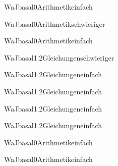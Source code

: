 \documentclass[12pt]{article}
\begin{document}
\begin{Add}{WaJ}{basal0}{Arithmetik}{einfach}
\end{Add}

\begin{Add}{WaJ}{basal0}{Arithmetik}{schwieriger}
\end{Add}

\begin{Add}{WaJ}{basal0}{Arithmetik}{einfach}
\end{Add}

\begin{Add}{WaJ}{basal1.2}{Gleichungen}{schwieriger}
\end{Add}

\begin{Add}{WaJ}{basal1.2}{Gleichungen}{einfach}
\end{Add}

\begin{Add}{WaJ}{basal1.2}{Gleichungen}{einfach}
\end{Add}

\begin{Add}{WaJ}{basal1.2}{Gleichungen}{einfach}
\end{Add}

\begin{Add}{WaJ}{basal1.2}{Gleichungen}{einfach}
\end{Add}

\begin{Add}{WaJ}{basal0}{Arithmetik}{einfach}
\end{Add}

\begin{Add}{WaJ}{basal0}{Arithmetik}{einfach}
\end{Add}
\end{document}
